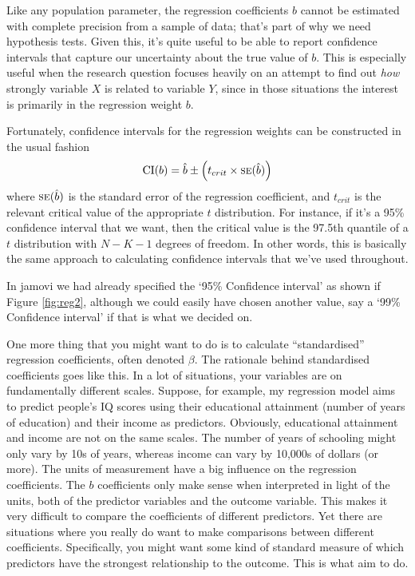 
Like any population parameter, the regression coefficients $b$ cannot be estimated with complete precision from a sample of data; that's part of why we need hypothesis tests. Given this, it's quite useful to be able to report confidence intervals that capture our uncertainty about the true value of $b$. This is especially useful when the research question focuses heavily on an attempt to find out {\it how} strongly variable $X$ is related to variable $Y$, since in those situations the interest is primarily in the regression weight $b$. 

\vspace{0.5cm}
\begin{mdframed}[style=MyFrame,nobreak=false]
Fortunately, confidence intervals for the regression weights can be constructed in the usual fashion
$$
\mbox{CI}(b) = \hat{b} \pm \left( t_{crit} \times \mbox{\textsc{se}}(\hat{b})  \right)
$$
where $\mbox{\textsc{se}}(\hat{b})$ is the standard error of the regression coefficient, and $t_{crit}$ is the relevant critical value of the appropriate $t$ distribution. For instance, if it's a 95\% confidence interval that we want, then the critical value is the 97.5th quantile of a $t$ distribution with $N-K-1$ degrees of freedom.  In other words, this is basically the same approach to calculating confidence intervals that we've used throughout. 
\end{mdframed}

In jamovi we had already specified the `95\% Confidence interval' as shown if Figure \ref{fig:reg2}, although we could easily have chosen another value, say a `99\% Confidence interval' if that is what we decided on. 



One more thing that you might want to do is to calculate ``standardised'' regression coefficients, often denoted $\beta$. The rationale behind standardised coefficients goes like this. In a lot of situations, your variables are on fundamentally different scales. Suppose, for example, my regression model aims to predict people's IQ scores using their educational attainment (number of years of education) and their income as predictors. Obviously, educational attainment and income are not on the same scales. The number of years of schooling might only vary by 10s of years, whereas income can vary by 10,000s of dollars (or more). The units of measurement have a big influence on the regression coefficients. The $b$ coefficients only make sense when interpreted in light of the units, both of the predictor variables and the outcome variable. This makes it very difficult to compare the coefficients of different predictors. Yet there are situations where you really do want to make comparisons between different coefficients. Specifically, you might want some kind of standard measure of which predictors have the strongest relationship to the outcome. This is what  aim to do. 

